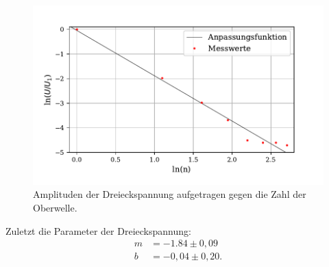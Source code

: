 \begin{figure}[H]
  \centering
  \includegraphics{plot3.pdf}
  \caption{Amplituden der Dreieckspannung aufgetragen gegen die Zahl der Oberwelle.}
  \label{fig:rechteck}
\end{figure}
Zuletzt die Parameter der Dreieckspannung:
\begin{align*}
  m &= -1.84 \pm 0,09 \\
  b &= -0,04 \pm 0,20 .
\end{align*}


